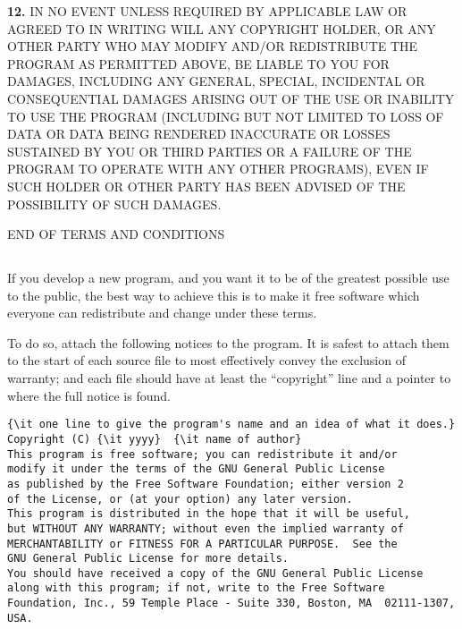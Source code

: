 {{\bf 12.} IN NO EVENT UNLESS REQUIRED BY APPLICABLE LAW OR AGREED TO IN
WRITING WILL ANY COPYRIGHT HOLDER, OR ANY OTHER PARTY WHO MAY MODIFY AND/OR
REDISTRIBUTE THE PROGRAM AS PERMITTED ABOVE, BE LIABLE TO YOU FOR DAMAGES,
INCLUDING ANY GENERAL, SPECIAL, INCIDENTAL OR CONSEQUENTIAL DAMAGES ARISING
OUT OF THE USE OR INABILITY TO USE THE PROGRAM (INCLUDING BUT NOT LIMITED TO
LOSS OF DATA OR DATA BEING RENDERED INACCURATE OR LOSSES SUSTAINED BY YOU OR
THIRD PARTIES OR A FAILURE OF THE PROGRAM TO OPERATE WITH ANY OTHER PROGRAMS),
EVEN IF SUCH HOLDER OR OTHER PARTY HAS BEEN ADVISED OF THE POSSIBILITY OF SUCH
DAMAGES. 

END OF TERMS AND CONDITIONS 

\subsection*{
}
\label{SEC4}

If you develop a new program, and you want it to be of the greatest possible
use to the public, the best way to achieve this is to make it free software
which everyone can redistribute and change under these terms. 

To do so, attach the following notices to the program. It is safest to attach
them to the start of each source file to most effectively convey the exclusion
of warranty; and each file should have at least the ``copyright'' line and a
pointer to where the full notice is found. 

\footnotesize
\begin{verbatim}
{\it one line to give the program's name and an idea of what it does.}
Copyright (C) {\it yyyy}  {\it name of author}
This program is free software; you can redistribute it and/or
modify it under the terms of the GNU General Public License
as published by the Free Software Foundation; either version 2
of the License, or (at your option) any later version.
This program is distributed in the hope that it will be useful,
but WITHOUT ANY WARRANTY; without even the implied warranty of
MERCHANTABILITY or FITNESS FOR A PARTICULAR PURPOSE.  See the
GNU General Public License for more details.
You should have received a copy of the GNU General Public License
along with this program; if not, write to the Free Software
Foundation, Inc., 59 Temple Place - Suite 330, Boston, MA  02111-1307, USA.
\end{verbatim}
\normalsize

}
